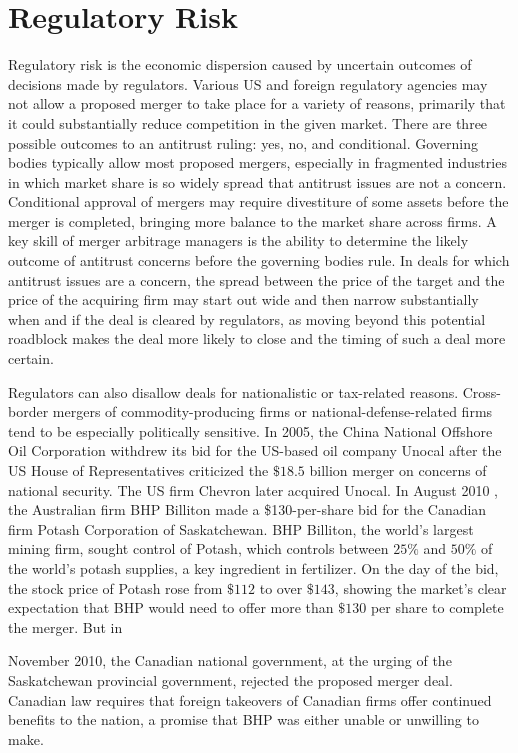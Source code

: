 \documentclass[11pt]{article}
\begin{document}
\section*{Regulatory Risk}
Regulatory risk is the economic dispersion caused by uncertain outcomes of decisions made by regulators. Various US and foreign regulatory agencies may not allow a proposed merger to take place for a variety of reasons, primarily that it could substantially reduce competition in the given market. There are three possible outcomes to an antitrust ruling: yes, no, and conditional. Governing bodies typically allow most proposed mergers, especially in fragmented industries in which market share is so widely spread that antitrust issues are not a concern. Conditional approval of mergers may require divestiture of some assets before the merger is completed, bringing more balance to the market share across firms. A key skill of merger arbitrage managers is the ability to determine the likely outcome of antitrust concerns before the governing bodies rule. In deals for which antitrust issues are a concern, the spread between the price of the target and the price of the acquiring firm may start out wide and then narrow substantially when and if the deal is cleared by regulators, as moving beyond this potential roadblock makes the deal more likely to close and the timing of such a deal more certain.

Regulators can also disallow deals for nationalistic or tax-related reasons. Cross-border mergers of commodity-producing firms or national-defense-related firms tend to be especially politically sensitive. In 2005, the China National Offshore Oil Corporation withdrew its bid for the US-based oil company Unocal after the US House of Representatives criticized the $\$ 18.5$ billion merger on concerns of national security. The US firm Chevron later acquired Unocal. In August 2010 , the Australian firm BHP Billiton made a \$130-per-share bid for the Canadian firm Potash Corporation of Saskatchewan. BHP Billiton, the world's largest mining firm, sought control of Potash, which controls between $25 \%$ and $50 \%$ of the world's potash supplies, a key ingredient in fertilizer. On the day of the bid, the stock price of Potash rose from $\$ 112$ to over $\$ 143$, showing the market's clear expectation that BHP would need to offer more than $\$ 130$ per share to complete the merger. But in

November 2010, the Canadian national government, at the urging of the Saskatchewan provincial government, rejected the proposed merger deal. Canadian law requires that foreign takeovers of Canadian firms offer continued benefits to the nation, a promise that BHP was either unable or unwilling to make.
\end{document}
